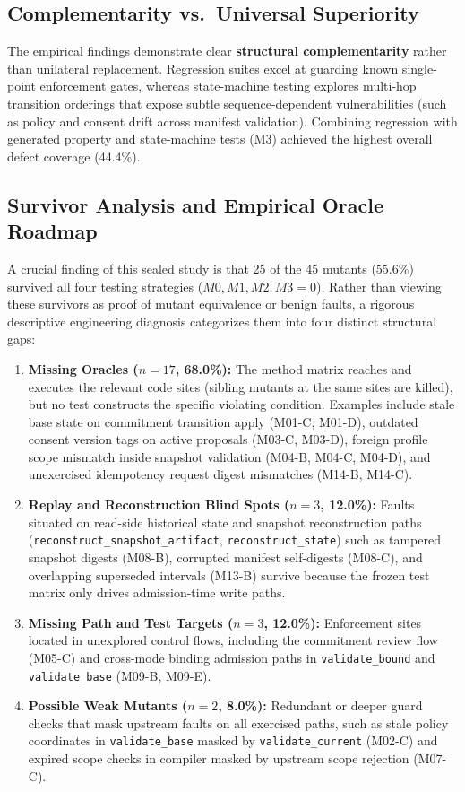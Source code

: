 \documentclass[runningheads]{llncs}
\begin{document}
\subsection{Complementarity vs.\ Universal Superiority}
The empirical findings demonstrate clear \textbf{structural complementarity} rather than unilateral replacement. Regression suites excel at guarding known single-point enforcement gates, whereas state-machine testing explores multi-hop transition orderings that expose subtle sequence-dependent vulnerabilities (such as policy and consent drift across manifest validation). Combining regression with generated property and state-machine tests (M3) achieved the highest overall defect coverage (44.4\%).

\subsection{Survivor Analysis and Empirical Oracle Roadmap}
A crucial finding of this sealed study is that 25 of the 45 mutants (55.6\%) survived all four testing strategies ($M0, M1, M2, M3 = 0$). Rather than viewing these survivors as proof of mutant equivalence or benign faults, a rigorous descriptive engineering diagnosis categorizes them into four distinct structural gaps:
\begin{enumerate}
    \item \textbf{Missing Oracles ($n = 17$, 68.0\%):} The method matrix reaches and executes the relevant code sites (sibling mutants at the same sites are killed), but no test constructs the specific violating condition. Examples include stale base state on commitment transition apply (M01-C, M01-D), outdated consent version tags on active proposals (M03-C, M03-D), foreign profile scope mismatch inside snapshot validation (M04-B, M04-C, M04-D), and unexercised idempotency request digest mismatches (M14-B, M14-C).
    \item \textbf{Replay and Reconstruction Blind Spots ($n = 3$, 12.0\%):} Faults situated on read-side historical state and snapshot reconstruction paths (\texttt{reconstruct\_snapshot\_artifact}, \texttt{reconstruct\_state}) such as tampered snapshot digests (M08-B), corrupted manifest self-digests (M08-C), and overlapping superseded intervals (M13-B) survive because the frozen test matrix only drives admission-time write paths.
    \item \textbf{Missing Path and Test Targets ($n = 3$, 12.0\%):} Enforcement sites located in unexplored control flows, including the commitment review flow (M05-C) and cross-mode binding admission paths in \texttt{validate\_bound} and \texttt{validate\_base} (M09-B, M09-E).
    \item \textbf{Possible Weak Mutants ($n = 2$, 8.0\%):} Redundant or deeper guard checks that mask upstream faults on all exercised paths, such as stale policy coordinates in \texttt{validate\_base} masked by \texttt{validate\_current} (M02-C) and expired scope checks in compiler masked by upstream scope rejection (M07-C).
\end{enumerate}
\end{document}
